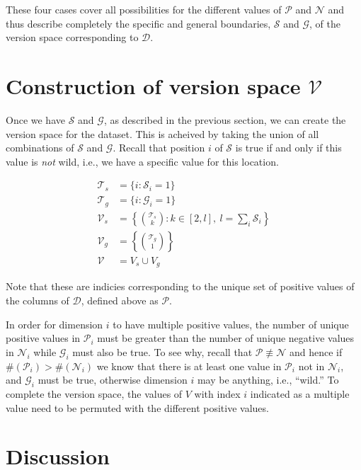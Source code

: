 These four cases cover all possibilities for the different values of $\mathcal{P}$ and $\mathcal{N}$ and thus describe completely the specific and general boundaries, $\mathcal{S}$ and $\mathcal{G}$, of the version space corresponding to $\mathcal{D}$.

\section{Construction of version space $\mathcal{V}$}

Once we have $\mathcal{S}$ and $\mathcal{G}$, as described in the previous section, we can create the version space for the dataset.  This is acheived by taking the union of all combinations of $\mathcal{S}$ and $\mathcal{G}$.  Recall that position $i$ of $\mathcal{S}$ is true if and only if this value is \emph{not} wild, i.e., we have a specific value for this location.

\begin{align*}
  \mathcal{T}_s &= \{i : \mathcal{S}_i = 1\} \\
  \mathcal{T}_g &= \{i : \mathcal{G}_i = 1\} \\
  \mathcal{V}_s &= \left\{ \binom{\mathcal{T}_s}{k} : k \in [2,l],\ l = \sum_i \mathcal{S}_i  \right\} \\
  \mathcal{V}_g &= \left\{ \binom{\mathcal{T}_g}{1} \right\} \\
  \mathcal{V}   &= V_s \cup V_g 
\end{align*}

Note that these are indicies corresponding to the unique set of positive values of the columns of $\mathcal{D}$, defined above as $\mathcal{P}$.

In order for dimension $i$ to have multiple positive values, the number of unique positive values in $\mathcal{P}_i$ must be greater than the number of unique negative values in $\mathcal{N}_i$ while $\mathcal{G}_i$ must also be true.  To see why, recall that $\mathcal{P} \not\equiv \mathcal{N}$ and hence if $\#(\mathcal{P}_i) > \#(\mathcal{N}_i)$ we know that there is at least one value in $\mathcal{P}_i$ not in $\mathcal{N}_i$, and $\mathcal{G}_i$ must be true, otherwise dimension $i$ may be anything, i.e., ``wild.''  To complete the version space, the values of $V$ with index $i$ indicated as a multiple value need to be permuted with the different positive values.

\section{Discussion}

